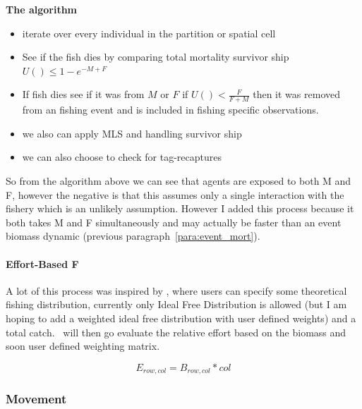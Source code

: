 \textbf{The algorithm}
\begin{itemize}
	\item iterate over every individual in the partition or spatial cell
	\item See if the fish dies by comparing total mortality survivor ship $U() \leq 1 - e^{- M + F}$
	\item If fish dies see if it was from $M$ or $F$ if $U() < \frac{F}{F + M}$ then it was removed from an fishing event and is included in fishing specific observations.
	\item we also can apply MLS and handling survivor ship
	\item we can also choose to check for tag-recaptures
\end{itemize}
So from the algorithm above we can see that agents are exposed to both M and F, however the negative is that this assumes only a single interaction with the fishery which is an unlikely assumption. However I added this process because it both takes M and F simultaneously and may actually be faster than an event biomass dynamic (previous paragraph~\ref{para:event_mort}).


\paragraph{Effort-Based F}\label{para:effort_based_F}
A lot of this process was inspired by \cite{truesdell2017effects}, where users can specify some theoretical fishing distribution, currently only Ideal Free Distribution is allowed (but I am hoping to add a weighted ideal free distribution with user defined weights) and a total catch. \IBM\ will then go evaluate the relative effort based on the biomass and soon user defined weighting matrix.

\begin{equation}
	E_{row,col} = B_{row,col} * col
\end{equation}




\subsubsection{Movement}
